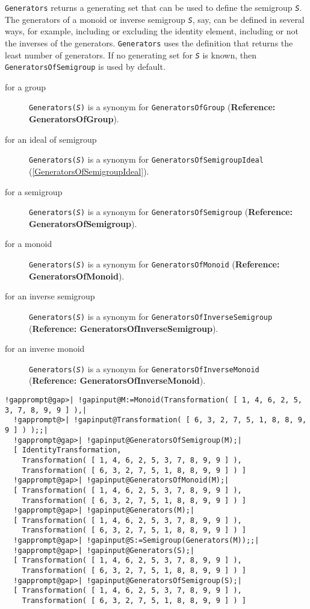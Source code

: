 \documentclass[a4paper,11pt]{report}
\begin{document}
{{{ \texttt{Generators} returns a generating set that can be used to define the semigroup \mbox{\texttt{\mdseries\slshape S}}. The generators of a monoid or inverse semigroup \mbox{\texttt{\mdseries\slshape S}}, say, can be defined in several ways, for example, including or excluding the
identity element, including or not the inverses of the generators. \texttt{Generators} uses the definition that returns the least number of generators. If no
generating set for \mbox{\texttt{\mdseries\slshape S}} is known, then \texttt{GeneratorsOfSemigroup} is used by default.

 
\begin{description}
\item[{for a group}] \texttt{Generators(\mbox{\texttt{\mdseries\slshape S}})} is a synonym for \texttt{GeneratorsOfGroup} (\textbf{Reference: GeneratorsOfGroup}). 
\item[{for an ideal of semigroup}] \texttt{Generators(\mbox{\texttt{\mdseries\slshape S}})} is a synonym for \texttt{GeneratorsOfSemigroupIdeal} (\ref{GeneratorsOfSemigroupIdeal}). 
\item[{for a semigroup}] \texttt{Generators(\mbox{\texttt{\mdseries\slshape S}})} is a synonym for \texttt{GeneratorsOfSemigroup} (\textbf{Reference: GeneratorsOfSemigroup}). 
\item[{for a monoid}] \texttt{Generators(\mbox{\texttt{\mdseries\slshape S}})} is a synonym for \texttt{GeneratorsOfMonoid} (\textbf{Reference: GeneratorsOfMonoid}). 
\item[{for an inverse semigroup}] \texttt{Generators(\mbox{\texttt{\mdseries\slshape S}})} is a synonym for \texttt{GeneratorsOfInverseSemigroup} (\textbf{Reference: GeneratorsOfInverseSemigroup}). 
\item[{for an inverse monoid}] \texttt{Generators(\mbox{\texttt{\mdseries\slshape S}})} is a synonym for \texttt{GeneratorsOfInverseMonoid} (\textbf{Reference: GeneratorsOfInverseMonoid}). 
\end{description}
 
\begin{Verbatim}[commandchars=!@|,fontsize=\small,frame=single,label=Example]
  !gapprompt@gap>| !gapinput@M:=Monoid(Transformation( [ 1, 4, 6, 2, 5, 3, 7, 8, 9, 9 ] ),|
  !gapprompt@>| !gapinput@Transformation( [ 6, 3, 2, 7, 5, 1, 8, 8, 9, 9 ] ) );;|
  !gapprompt@gap>| !gapinput@GeneratorsOfSemigroup(M);|
  [ IdentityTransformation, 
    Transformation( [ 1, 4, 6, 2, 5, 3, 7, 8, 9, 9 ] ), 
    Transformation( [ 6, 3, 2, 7, 5, 1, 8, 8, 9, 9 ] ) ]
  !gapprompt@gap>| !gapinput@GeneratorsOfMonoid(M);|
  [ Transformation( [ 1, 4, 6, 2, 5, 3, 7, 8, 9, 9 ] ), 
    Transformation( [ 6, 3, 2, 7, 5, 1, 8, 8, 9, 9 ] ) ]
  !gapprompt@gap>| !gapinput@Generators(M);|
  [ Transformation( [ 1, 4, 6, 2, 5, 3, 7, 8, 9, 9 ] ), 
    Transformation( [ 6, 3, 2, 7, 5, 1, 8, 8, 9, 9 ] ) ]
  !gapprompt@gap>| !gapinput@S:=Semigroup(Generators(M));;|
  !gapprompt@gap>| !gapinput@Generators(S);|
  [ Transformation( [ 1, 4, 6, 2, 5, 3, 7, 8, 9, 9 ] ), 
    Transformation( [ 6, 3, 2, 7, 5, 1, 8, 8, 9, 9 ] ) ]
  !gapprompt@gap>| !gapinput@GeneratorsOfSemigroup(S);|
  [ Transformation( [ 1, 4, 6, 2, 5, 3, 7, 8, 9, 9 ] ), 
    Transformation( [ 6, 3, 2, 7, 5, 1, 8, 8, 9, 9 ] ) ]
\end{Verbatim}
 }

}}
\end{document}
